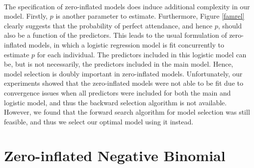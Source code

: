 \documentclass[12pt, titlepage]{article}
\begin{document}
	\paragraph{} The specification of zero-inflated models does induce additional complexity in our model. Firstly, $p$ is another parameter to estimate. Furthermore, Figure \ref{famrel} clearly suggests that the probability of perfect attendance, and hence $p$, should also be a function of the predictors. This leads to the usual formulation of zero-inflated models, in which a logistic regression model is fit concurrently to estimate $p$ for each individual. The predictors included in this logistic model can be, but is not necessarily, the predictors included in the main model. Hence, model selection is doubly important in zero-inflated models. Unfortunately, our experiments showed that the zero-inflated models were not able to be fit due to convergence issues when all predictors were included for both the main and logistic model, and thus the backward selection algorithm is not available. However, we found that the forward search algorithm for model selection was still feasible, and thus we select our optimal model using it instead. 
	\section{Zero-inflated Negative Binomial} 
	
\end{document}

